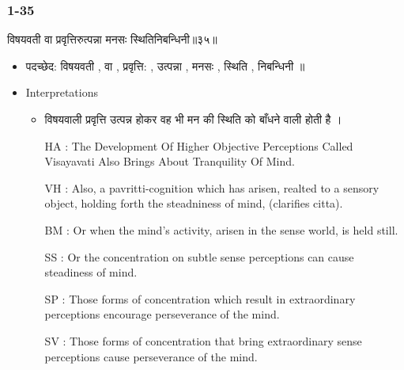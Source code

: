 \begin{frame}[fragile]\frametitle{ 1-35}
\begin{sanskrit}
विषयवती वा प्रवृत्तिरुत्पन्ना मनसः स्थितिनिबन्धिनी॥३५॥
\end{sanskrit}

	\begin{itemize}
	\item पदच्छेद: विषयवती , वा , प्रवृत्ति: , उत्पन्ना , मनसः , स्थिति , निबन्धिनी ॥
	\item Interpretations
		\begin{itemize}	
		\item विषयवाली प्रवृत्ति उत्पन्न होकर वह भी मन की स्थिति को बाँधने वाली होती है ।
		\item [HA]: The Development Of Higher Objective Perceptions Called Visayavati Also Brings About Tranquility Of Mind.
		\item [VH]: Also, a pavritti-cognition which has arisen, realted to a sensory object, holding forth the steadniness of mind, (clarifies citta).
		\item [BM]: Or when the mind’s activity, arisen in the sense world, is held still.
		\item [SS]: Or the concentration on subtle sense perceptions can cause steadiness of mind.
		\item [SP]: Those forms of concentration which result in extraordinary perceptions encourage perseverance of the mind.
		\item [SV]: Those forms of concentration that bring extraordinary sense perceptions cause perseverance of the mind. 
		\end{itemize}
	\end{itemize}
	
\end{frame}




